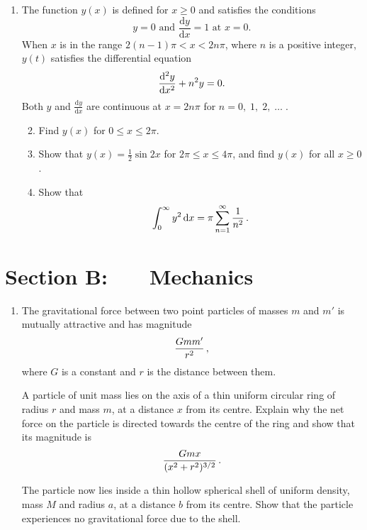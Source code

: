 \documentclass[a4, 11pt]{report}
\newlength{\qspace}
\newcounter{qnumber}
\newenvironment{question}%
 {\vspace{\qspace}
  \begin{enumerate}[\bfseries 1\quad][10]%
    \setcounter{enumi}{\value{qnumber}}%
    \item%
 }
{
  \end{enumerate}
  \filbreak
  \stepcounter{qnumber}
 }
\newenvironment{questionparts}[1][1]%
 {
  \begin{enumerate}[\bfseries (i)]%
    \setcounter{enumii}{#1}
    \addtocounter{enumii}{-1}
    \setlength{\itemsep}{5mm}
    \setlength{\parskip}{8pt}
 }
 {
  \end{enumerate}
 }
\def\d{{\mathrm d}}
\def\le{\leqslant}
\def\ge{\geqslant}
\begin{document}
\begin{question}	
The function $y(x)$ is  defined for $x\ge0$ and satisfies the conditions
 \[
y=0
\mbox{ \ \  and \ \ }
\frac{\d y}{\d x}=1
\mbox{ \  \  at $x=0$}.
\]
When $x$ is in the range $2(n-1)\pi< x <2n\pi$, where $n$ is a positive 
integer, $y(t)$ satisfies the differential
equation 
$$
{\d^2y \over \d x^2} + n^2 y=0. 
$$
Both $y$ and $\displaystyle \frac{\d y}{\d x} $ are continuous at $x=2n\pi$ for 
$n=0,\; 1,\;2,\; \ldots\;$. 

\begin{questionparts}
\item Find $y(x)$ for $0\le x \le 2\pi$. 

\item Show that $y(x) = \frac12 \sin 2x $ for 
$2\pi\le x\le 4\pi$, and find $y(x)$ for all $x\ge0$.

\item Show that 
$$
\int_0^\infty y^2 \,\d x = \pi \sum_{n=1}^\infty {1\over n^2} \,.
$$
\end{questionparts}
\end{question}	
		

		
	
\newpage
\section*{Section B: \ \ \ Mechanics}


	
\begin{question}
The gravitational force between two point 
particles of masses $m$ and $m'$ is mutually attractive and has magnitude
$$
{G m m' \over r^2}\,,
$$
where $G$ is a constant and $r$ is the distance between them.

A particle of unit mass 
lies on the axis of a thin uniform circular ring of radius
$r$ and mass $m$, at a distance $x$ from its centre. Explain why
the net force on the particle is directed towards the centre of
the ring and show that its magnitude is
$$
{G m x \over (x^2 + r^2)^{3/2}} \,.
$$

The particle now lies inside a thin hollow spherical
shell of uniform density, mass $M$ and radius $a$, at a distance
$b$ from its centre. Show that the particle
experiences no gravitational force due to the shell.

	\end{question}
	
\end{document}
